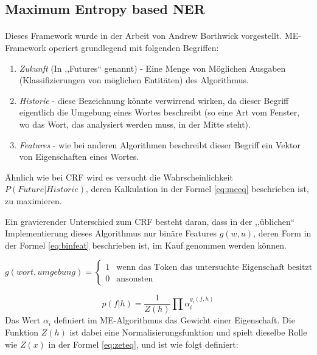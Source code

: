 \subsection{Maximum Entropy based NER} \label{sec:MITIEGRUND}
\paragraph{}
Dieses Framework wurde in der Arbeit von Andrew Borthwick\cite{borthwick1999maximum} vorgestellt. ME-Framework operiert grundlegend mit folgenden Begriffen:
\begin{enumerate}
\item \textit{Zukunft} (In \cite{borthwick1999maximum} ,,Futures`` genannt) - Eine Menge von Möglichen Ausgaben (Klassifizierungen von möglichen Entitäten) des Algorithmus.
\item \textit{Historie} - diese Bezeichnung könnte verwirrend wirken, da dieser Begriff eigentlich die Umgebung eines Wortes beschreibt (so eine Art vom Fenster, wo das Wort, das analysiert werden muss, in der Mitte steht).
\item \textit{Features} - wie bei anderen Algorithmen beschreibt dieser Begriff ein Vektor von Eigenschaften eines Wortes.
\end{enumerate}
Ähnlich wie bei CRF wird es versucht die Wahrscheinlichkeit $P(Future|Historie)$, deren Kalkulation in der Formel \ref{eq:meeq} beschrieben ist, zu maximieren. 

Ein gravierender Unterschied zum CRF besteht daran, dass in der ,,üblichen`` Implementierung dieses Algorithmus nur binäre Features\cite{berger1996maximum} $g(w,u)$, deren Form in der Formel \ref{eq:binfeat} beschrieben ist, im Kauf genommen werden können. 

\begin{equation} \label{eq:binfeat}
g(wort, umgebung) = 
\begin{cases}
1  & \text{wenn das Token das untersuchte Eigenschaft besitzt} \\
0 & \text{ansonsten} 
\end{cases}
\end{equation}

\begin{equation} \label{eq:meeq}
p(f|h) = \frac{1}{Z(h)}\prod \alpha_i^{g_i(f,h)}
\end{equation}
Das Wert $\alpha_i$ definiert im ME-Algorithmus das Gewicht einer Eigenschaft. Die Funktion $Z(h)$ ist dabei eine Normalisierungsfunktion und spielt dieselbe Rolle wie $Z(x)$ in der Formel \ref{eq:zeteq}, und ist wie folgt definiert:

